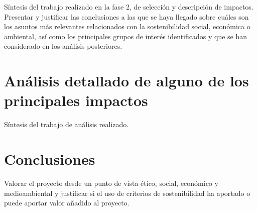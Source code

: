 Síntesis del trabajo realizado en la fase 2, de selección y descripción de impactos. Presentar y justificar las conclusiones a las que se haya llegado sobre cuáles son los asuntos más relevantes relacionados con la sostenibilidad social, económica o ambiental, así como los principales grupos de interés identificados y que se han considerado en los análisis posteriores.

\section{Análisis detallado de alguno de los principales impactos}
\label{sec:aspectos-eticos-analisis}

Síntesis del trabajo de análisis realizado.

\section{Conclusiones}
\label{sec:aspectos-eticos-conclusiones}

Valorar el proyecto desde un punto de vista ético, social, económico y medioambiental y justificar si el uso de criterios de sostenibilidad ha aportado o puede aportar valor añadido al proyecto.

